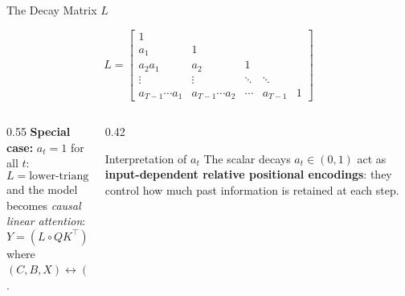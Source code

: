 \begin{frame}{The Decay Matrix $L$}

  \[
    L = \begin{bmatrix}
      1 & & & & \\
      a_1 & 1 & & & \\
      a_2 a_1 & a_2 & 1 & & \\
      \vdots & \vdots & \ddots & \ddots & \\
      a_{T-1}\!\cdots\!a_1 & a_{T-1}\!\cdots\!a_2 & \cdots & a_{T-1} & 1
    \end{bmatrix}
  \]

  \vspace{0.5em}
  \begin{columns}
    \begin{column}{0.55\textwidth}
      \textbf{Special case:} $a_t = 1$ for all $t$:
      \[
        L = \text{lower-triangular causal mask}
      \]
      and the model becomes \emph{causal linear attention}:
      \[
        Y = (L \circ QK^\top)\, V
      \]
      where $(C, B, X) \leftrightarrow (Q, K, V)$.
    \end{column}
    \begin{column}{0.42\textwidth}
      \begin{alertblock}{Interpretation of $a_t$}
        The scalar decays $a_t \in (0,1)$ act as \textbf{input-dependent relative positional encodings}: they control how much past information is retained at each step.
      \end{alertblock}
    \end{column}
  \end{columns}
\end{frame}

